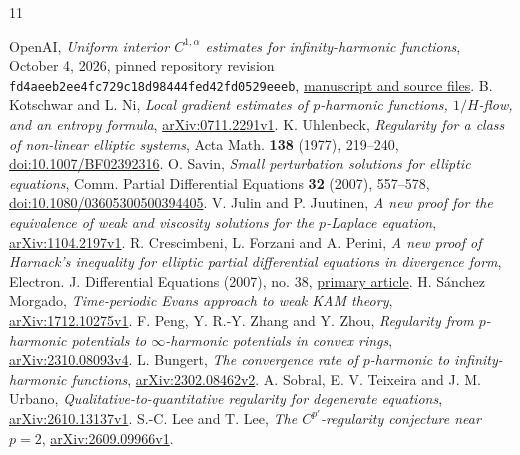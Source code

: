 \begin{thebibliography}{11}
\raggedright
\small
\setlength{\itemsep}{2pt}
OpenAI, \emph{Uniform interior $C^{1,\alpha}$ estimates for
infinity-harmonic functions}, October 4, 2026, pinned repository
revision \texttt{fd4aeeb2ee4fc729c18d98444fed42fd0529eeeb},
\href{https://github.com/openai/math/tree/fd4aeeb2ee4fc729c18d98444fed42fd0529eeeb/preprints/Uniform-Interior-C1alpha-Estimates-for-Infinity-Harmonic-Functions-October-4-2026}{manuscript and source files}.
B. Kotschwar and L. Ni, \emph{Local gradient estimates of $p$-harmonic
functions, $1/H$-flow, and an entropy formula},
\href{https://arxiv.org/abs/0711.2291v1}{arXiv:0711.2291v1}.
K. Uhlenbeck, \emph{Regularity for a class of non-linear elliptic
systems}, Acta Math. \textbf{138} (1977), 219--240,
\href{https://doi.org/10.1007/BF02392316}{doi:10.1007/BF02392316}.
O. Savin, \emph{Small perturbation solutions for elliptic equations},
Comm. Partial Differential Equations \textbf{32} (2007), 557--578,
\href{https://doi.org/10.1080/03605300500394405}{doi:10.1080/03605300500394405}.
V. Julin and P. Juutinen, \emph{A new proof for the equivalence of
weak and viscosity solutions for the $p$-Laplace equation},
\href{https://arxiv.org/abs/1104.2197v1}{arXiv:1104.2197v1}.
R. Crescimbeni, L. Forzani and A. Perini, \emph{A new proof of
Harnack's inequality for elliptic partial differential equations in
divergence form}, Electron. J. Differential Equations (2007), no. 38,
\href{https://ejde.math.txstate.edu/Volumes/2007/38/crescimbeni.pdf}{primary article}.
H. S\'anchez Morgado, \emph{Time-periodic Evans approach to weak KAM
theory}, \href{https://arxiv.org/abs/1712.10275v1}{arXiv:1712.10275v1}.
F. Peng, Y. R.-Y. Zhang and Y. Zhou, \emph{Regularity from
$p$-harmonic potentials to $\infty$-harmonic potentials in convex rings},
\href{https://arxiv.org/abs/2310.08093v4}{arXiv:2310.08093v4}.
L. Bungert, \emph{The convergence rate of $p$-harmonic to
infinity-harmonic functions},
\href{https://arxiv.org/abs/2302.08462v2}{arXiv:2302.08462v2}.
A. Sobral, E. V. Teixeira and J. M. Urbano,
\emph{Qualitative-to-quantitative regularity for degenerate equations},
\href{https://arxiv.org/abs/2610.13137v1}{arXiv:2610.13137v1}.
S.-C. Lee and T. Lee, \emph{The $C^{p'}$-regularity conjecture near $p=2$},
\href{https://arxiv.org/abs/2609.09966v1}{arXiv:2609.09966v1}.
\end{thebibliography}
